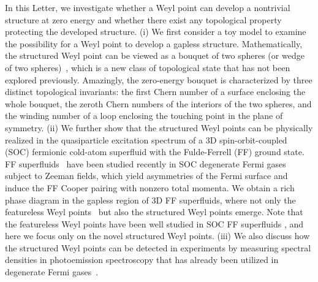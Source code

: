 \documentclass[prl,aps,twocolumn,showpacs,floatfix]{revtex4}
\begin{document}
In this Letter, we investigate whether a Weyl point can develop a nontrivial
structure at zero energy and whether there exist any topological property
protecting the developed structure. (i) We first consider a toy model to
examine the possibility for a Weyl point to develop a gapless structure.
Mathematically, the structured Weyl point can be viewed as a bouquet of two
spheres (or wedge of two spheres)~\cite{Hatcher}, which is a new class of
topological state that has not been explored previously. Amazingly, the
zero-energy bouquet is characterized by three distinct topological
invariants: the first Chern number of a surface enclosing the whole bouquet,
the zeroth Chern numbers of the interiors of the two spheres, and the
winding number of a loop enclosing the touching point in the plane of
symmetry. (ii) We further show that the structured Weyl points can be
physically realized in the quasiparticle excitation spectrum of a 3D
spin-orbit-coupled (SOC) fermionic cold-atom superfluid with the
Fulde-Ferrell (FF) ground state. FF superfluids~\cite%
{Zheng2013PRA,FanWu2013PRL,Liu2013PRA,Lin2013NJP,Qu2013NC,Yi2013NC,XJ2013PRA,Chun2013PRL,MGong2014PRB,YGao2014arXiv,YongBKT,YongReveiw}
have been studied recently in SOC degenerate Fermi gases subject to Zeeman
fields, which yield asymmetries of the Fermi surface and induce the FF
Cooper pairing with nonzero total momenta. We obtain a rich phase diagram in
the gapless region of 3D FF superfluids, where not only the featureless Weyl
points~\cite{Gong2011prl,Balents2012PRB,Tumanta2012PRB,
Das2013PRB,Sumanta2013PRA,Yong2014PRL,Yang2014PRL,Balicas2013arXiv,Dong2014arXiv,LiuBo2014arXiv}
but also the structured Weyl points emerge. 
Note that the featureless Weyl points have been well studied in SOC FF superfluids \cite{Yong2014PRL}, 
and here we focus only on the novel structured Weyl points. (iii) We also discuss how the structured Weyl points can be
detected in experiments by measuring spectral densities in photoemission
spectroscopy that has already been utilized in degenerate Fermi gases~\cite%
{Jin08Nature}.
\end{document}
